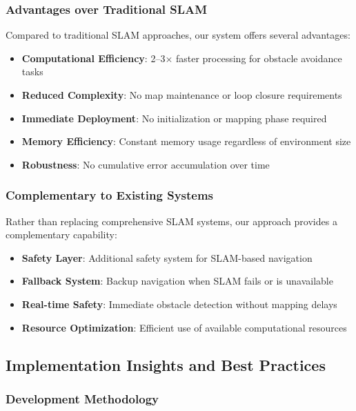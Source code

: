 \documentclass[10pt]{article}
\begin{document}
\subsubsection{Advantages over Traditional SLAM}

Compared to traditional SLAM approaches, our system offers several advantages:

\begin{itemize}
\item \textbf{Computational Efficiency}: 2--3$\times$ faster processing for obstacle avoidance tasks
\item \textbf{Reduced Complexity}: No map maintenance or loop closure requirements
\item \textbf{Immediate Deployment}: No initialization or mapping phase required
\item \textbf{Memory Efficiency}: Constant memory usage regardless of environment size
\item \textbf{Robustness}: No cumulative error accumulation over time
\end{itemize}

\subsubsection{Complementary to Existing Systems}

Rather than replacing comprehensive SLAM systems, our approach provides a complementary capability:

\begin{itemize}
\item \textbf{Safety Layer}: Additional safety system for SLAM-based navigation
\item \textbf{Fallback System}: Backup navigation when SLAM fails or is unavailable
\item \textbf{Real-time Safety}: Immediate obstacle detection without mapping delays
\item \textbf{Resource Optimization}: Efficient use of available computational resources
\end{itemize}

\subsection{Implementation Insights and Best Practices}

\subsubsection{Development Methodology}
\end{document}
